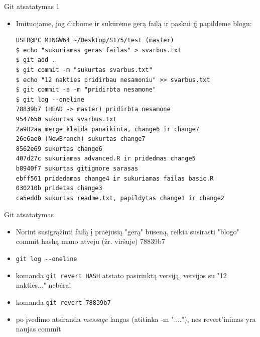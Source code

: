 \documentclass[11pt,xcolor=table]{beamer}
\begin{document}

\begin{frame}[fragile]{Git atsatatymas 1}
\begin{itemize}
\item Imituojame, jog dirbome ir sukūrėme gerą failą ir paskui jį papildėme blogu:
\begin{lstlisting}
USER@PC MINGW64 ~/Desktop/S175/test (master)
$ echo "sukuriamas geras failas" > svarbus.txt
$ git add .
$ git commit -m "sukurtas svarbus.txt"
$ echo "12 nakties pridirbau nesamoniu" >> svarbus.txt
$ git commit -a -m "pridirbta nesamone"
$ git log --oneline
78839b7 (HEAD -> master) pridirbta nesamone
9547650 sukurtas svarbus.txt
2a982aa merge klaida panaikinta, change6 ir change7
26e6ae0 (NewBranch) sukurtas change7
8562e69 sukurtas change6
407d27c sukuriamas advanced.R ir pridedmas change5
b8940f7 sukurtas gitignore sarasas
ebff561 pridedamas change4 ir sukuriamas failas basic.R
030210b pridetas change3
ca5eddb sukurtas readme.txt, papildytas change1 ir change2
\end{lstlisting}
\end{itemize}
\end{frame}



\begin{frame}[fragile]{Git atsatatymas}
\begin{itemize}
\item Norint susigrąžinti failą į praėjusią "gerą" būseną, reikia susirasti "blogo" commit hashą  mano atveju (žr. viršuje) 78839b7
\item \colorbox{listinggray}{\lstinline|git log --oneline|}
\item komanda \colorbox{listinggray}{\lstinline|git revert HASH|} atstato pasirinktą versiją, versijos su "12 nakties..." nebėra!
\item komanda \colorbox{listinggray}{\lstinline|git revert 78839b7|}
\item po įvedimo atsiranda \textit{message} langas (atitinka -m "...."), nes revert'inimas yra naujas commit
\end{itemize}
\end{frame}


\end{document}
